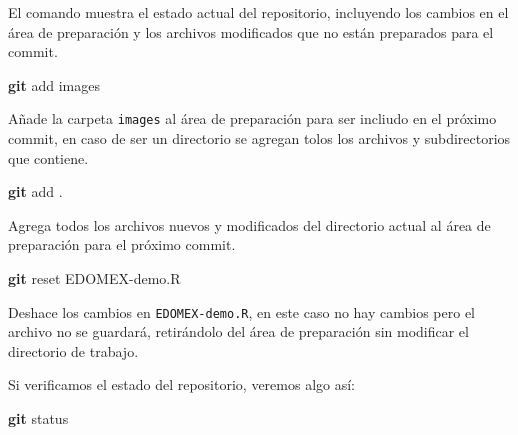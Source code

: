 \documentclass[
]{book}
\newenvironment{Shaded}{\begin{snugshade}}{\end{snugshade}}
\newcommand{\FunctionTok}[1]{\textcolor[rgb]{0.13,0.29,0.53}{\textbf{#1}}}
\newcommand{\NormalTok}[1]{#1}
\begin{document}
El comando muestra el estado actual del repositorio, incluyendo los cambios en el área de preparación y los archivos modificados que no están preparados para el commit.

\begin{Shaded}
\begin{Highlighting}[]
\FunctionTok{git}\NormalTok{ add images}
\end{Highlighting}
\end{Shaded}

Añade la carpeta \texttt{images} al área de preparación para ser incliudo en el próximo commit, en caso de ser un directorio se agregan tolos los archivos y subdirectorios que contiene.

\begin{Shaded}
\begin{Highlighting}[]
\FunctionTok{git}\NormalTok{ add .}
\end{Highlighting}
\end{Shaded}

Agrega todos los archivos nuevos y modificados del directorio actual al área de preparación para el próximo commit.

\begin{Shaded}
\begin{Highlighting}[]
\FunctionTok{git}\NormalTok{ reset EDOMEX{-}demo.R}
\end{Highlighting}
\end{Shaded}

Deshace los cambios en \texttt{EDOMEX-demo.R}, en este caso no hay cambios pero el archivo no se guardará, retirándolo del área de preparación sin modificar el directorio de trabajo.

Si verificamos el estado del repositorio, veremos algo así:

\begin{Shaded}
\begin{Highlighting}[]
\FunctionTok{git}\NormalTok{ status}
\end{Highlighting}
\end{Shaded}
\end{document}
